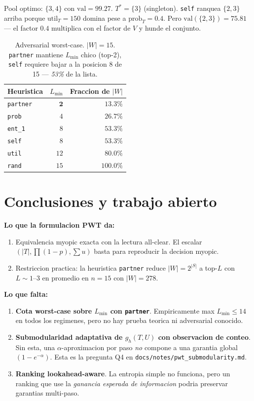\documentclass[11pt]{article}
\begin{document}
Pool optimo: $\{3, 4\}$ con $\text{val} = 99.27$.
$T^* = \{3\}$ (singleton). \texttt{self} ranquea $\{2, 3\}$ arriba
porque $\text{util}_T = 150$ domina pese a $\text{prob}_T = 0.4$. Pero
$\text{val}(\{2,3\}) = 75.81$ — el factor $0.4$ multiplica con el
factor de $V$ y hunde el conjunto.

\begin{table}[h]
\centering
\begin{tabular}{l r r}
\toprule
Heuristica & $L_{\min}$ & Fraccion de $|W|$ \\
\midrule
\texttt{partner} & $\mathbf{2}$ & $13.3\%$ \\
\texttt{prob} & $4$ & $26.7\%$ \\
\texttt{ent\_1} & $8$ & $53.3\%$ \\
\texttt{self} & $8$ & $53.3\%$ \\
\texttt{util} & $12$ & $80.0\%$ \\
\texttt{rand} & $15$ & $100.0\%$ \\
\bottomrule
\end{tabular}
\caption{Adversarial worst-case. $|W| = 15$. \texttt{partner} mantiene
$L_{\min}$ chico (top-2), \texttt{self} requiere bajar a la posicion 8
de 15 — \emph{53\%} de la lista.}
\end{table}

\section{Conclusiones y trabajo abierto}

\textbf{Lo que la formulacion PWT da:}
\begin{enumerate}
\item Equivalencia myopic exacta con la lectura all-clear. El escalar
  $(|T|, \prod(1-p), \sum u)$ basta para reproducir la decision myopic.
\item Restriccion practica: la heuristica \texttt{partner} reduce
  $|W| = 2^{|S|}$ a top-$L$ con $L \sim 1$--$3$ en promedio en
  $n = 15$ con $|W| = 278$.
\end{enumerate}

\textbf{Lo que falta:}
\begin{enumerate}
\item \textbf{Cota worst-case sobre $L_{\min}$ con \texttt{partner}}.
  Empiricamente max $L_{\min} \le 14$ en todos los regimenes, pero no
  hay prueba teorica ni adversarial conocido.
\item \textbf{Submodularidad adaptativa de $g_h(T, U)$ con observacion
  de conteo}. Sin esta, una $\alpha$-aproximacion por paso \emph{no}
  compone a una garantia global $(1 - e^{-\alpha})$. Esta es la
  pregunta Q4 en \texttt{docs/notes/pwt\_submodularity.md}.
\item \textbf{Ranking lookahead-aware}. La entropia simple no funciona,
  pero un ranking que use la \emph{ganancia esperada de informacion}
  podria preservar garantias multi-paso.
\end{enumerate}
\end{document}
